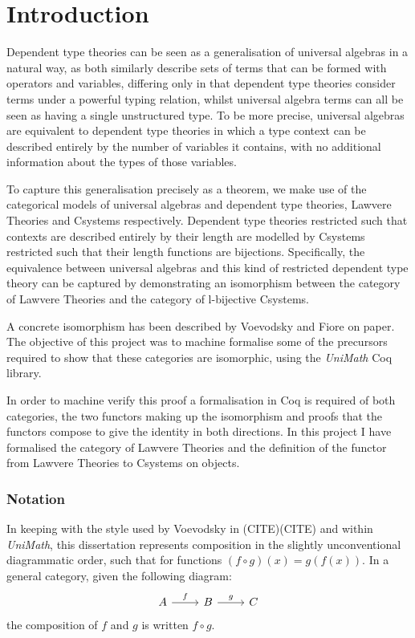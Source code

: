 \chapter{Introduction}
Dependent type theories can be seen as a generalisation of universal algebras in
a natural way, as both similarly describe sets of terms that can be formed with
operators and variables, differing only in that dependent type theories consider
terms under a powerful typing relation, whilst universal algebra terms can all
be seen as having a single unstructured type. To be more precise, universal
algebras are equivalent to dependent type theories in which a type context can
be described entirely by the number of variables it contains, with no
additional information about the types of those variables.

To capture this generalisation precisely as a theorem, we make use of the
categorical models of universal algebras and dependent type theories, Lawvere
Theories and Csystems respectively. Dependent type theories restricted such that
contexts are described entirely by their length are modelled by Csystems
restricted such that their length functions are bijections. Specifically, the
equivalence between universal algebras and this kind of restricted dependent
type theory can be captured by demonstrating an isomorphism between the category
of Lawvere Theories and the category of l-bijective Csystems.

A concrete isomorphism has been described by Voevodsky and Fiore on paper. The
objective of this project was to machine formalise some of the precursors
required to show that these categories are isomorphic, using the
\textit{UniMath} Coq library. 

In order to machine verify this proof a formalisation in Coq is required of
both categories, the two functors making up the isomorphism and proofs that the
functors compose to give the identity in both directions. In this project I have
formalised the category of Lawvere Theories and the definition of the functor
from Lawvere Theories to Csystems on objects.

\subsection*{Notation}
In keeping with the style used by Voevodsky in (CITE)(CITE) and within
\textit{UniMath}, this dissertation represents composition in the slightly
unconventional diagrammatic order, such that for functions $(f\circ g)(x) =
g(f(x))$. In a general category, given the following diagram:
\[
\begin{tikzcd}
    A\ar[r,"f"]&B\ar[r,"g"]&C
\end{tikzcd}
\]
the composition of $f$ and $g$ is written $f\circ g$.